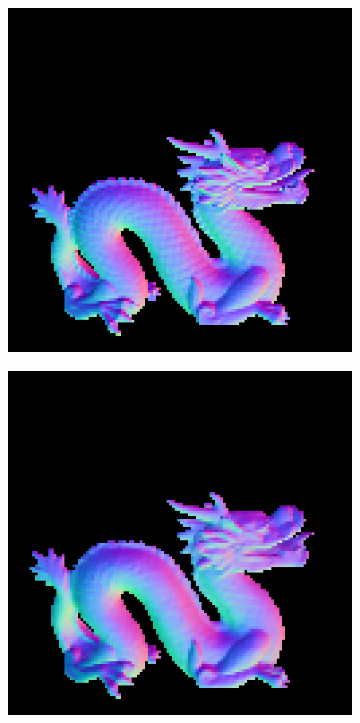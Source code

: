 
\begin{figure}
	\centering
	\captionsetup{width=\linewidth}
	\begin{subfigure}[b]{0.18\linewidth}
		\includegraphics[width=\linewidth]{./Figures/gcnn_synthetic/fancy_eval_7_groundtruth.png}
	\end{subfigure}
	\begin{subfigure}[b]{0.18\linewidth}
		\includegraphics[width=\linewidth]{./Figures/gcnn_synthetic/fancy_eval_7_normal_f1.png}

\end{subfigure}
\end{figure}
